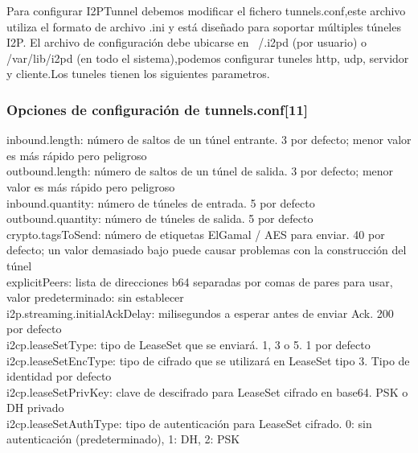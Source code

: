 \documentclass[12]{article}
\begin{document}
Para configurar I2PTunnel debemos modificar el fichero tunnels.conf,este archivo utiliza el formato de archivo .ini y está diseñado para soportar múltiples túneles I2P. El archivo 
de configuración debe ubicarse en  ~/.i2pd (por usuario) o /var/lib/i2pd (en todo el sistema),podemos configurar tuneles http, udp, servidor y cliente.Los tuneles tienen los 
siguientes parametros.
\\


\subsubsection{Opciones de configuración de tunnels.conf[11]}
inbound.length: número de saltos de un túnel entrante. 3 por defecto; menor valor es más rápido pero peligroso
\\

outbound.length: número de saltos de un túnel de salida. 3 por defecto; menor valor es más rápido pero peligroso
\\

inbound.quantity: número de túneles de entrada. 5 por defecto
\\

outbound.quantity: número de túneles de salida. 5 por defecto
\\

crypto.tagsToSend: número de etiquetas ElGamal / AES para enviar. 40 por defecto; un valor demasiado bajo puede causar problemas con la construcción del túnel
\\

explicitPeers: lista de direcciones b64 separadas por comas de pares para usar, valor predeterminado: sin establecer
\\

i2p.streaming.initialAckDelay: milisegundos a esperar antes de enviar Ack. 200 por defecto
\\

i2cp.leaseSetType: tipo de LeaseSet que se enviará. 1, 3 o 5. 1 por defecto
\\

i2cp.leaseSetEncType: tipo de cifrado que se utilizará en LeaseSet tipo 3. Tipo de identidad por defecto
\\

i2cp.leaseSetPrivKey: clave de descifrado para LeaseSet cifrado en base64. PSK o DH privado
\\

i2cp.leaseSetAuthType: tipo de autenticación para LeaseSet cifrado. 0: sin autenticación (predeterminado), 1: DH, 2: PSK
\\
\end{document}
